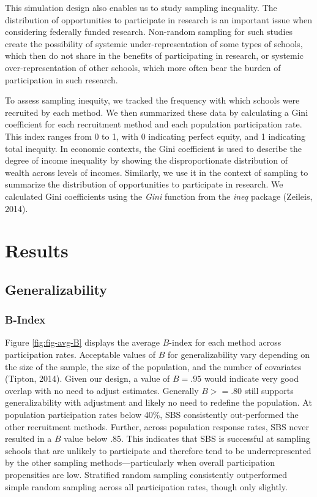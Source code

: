 \documentclass[
  english,
  man,floatsintext]{apa6}
\begin{document}
This simulation design also enables us to study sampling inequality. The distribution of opportunities to participate in research is an important issue when considering federally funded research.
Non-random sampling for such studies create the possibility of systemic under-representation of some types of schools, which then do not share in the benefits of participating in research, or systemic over-representation of other schools, which more often bear the burden of participation in such research.

To assess sampling inequity, we tracked the frequency with which schools were recruited by each method. We then summarized these data by calculating a Gini coefficient for each recruitment method and each population participation rate. This index ranges from 0 to 1, with 0 indicating perfect equity, and 1 indicating total inequity.
In economic contexts, the Gini coefficient is used to describe the degree of income inequality by showing the disproportionate distribution of wealth across levels of incomes. Similarly, we use it in the context of sampling to summarize the distribution of opportunities to participate in research. We calculated Gini coefficients using the \emph{Gini} function from the \emph{ineq} package (Zeileis, 2014).

\hypertarget{results}{%
\section{Results}\label{results}}

\hypertarget{generalizability-1}{%
\subsection{Generalizability}\label{generalizability-1}}

\hypertarget{b-index}{%
\subsubsection{B-Index}\label{b-index}}

Figure \ref{fig:fig-avg-B} displays the average \(B\)-index for each method across participation rates. Acceptable values of \(B\) for generalizability vary depending on the size of the sample, the size of the population, and the number of covariates (Tipton, 2014). Given our design, a value of \(B = .95\) would indicate very good overlap with no need to adjust estimates. Generally \(B >= .80\) still supports generalizability with adjustment and likely no need to redefine the population. At population participation rates below 40\%, SBS consistently out-performed the other recruitment methods. Further, across population response rates, SBS never resulted in a \(B\) value below .85. This indicates that SBS is successful at sampling schools that are unlikely to participate and therefore tend to be underrepresented by the other sampling methods---particularly when overall participation propensities are low. Stratified random sampling consistently outperformed simple random sampling across all participation rates, though only slightly.
\end{document}
